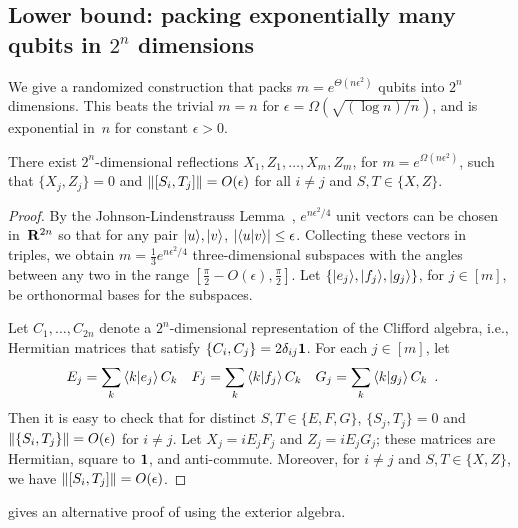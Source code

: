 \documentclass[preprintnumbers,11pt,onecolumn]{article}
\begin{document}
\subsection{Lower bound: packing exponentially many qubits in $2^n$ dimensions} \label{s:packingqubitslowerbound}

We give a randomized construction that packs $m = e^{\Theta(n \epsilon^2)}$ qubits into $2^n$ dimensions.  This beats the trivial $m = n$ for $\epsilon = \Omega(\sqrt{(\log n) / n})$, and is exponential in~$n$ for constant $\epsilon > 0$.  

\begin{theorem} \label{t:qubitpacking}
There exist $2^n$-dimensional reflections $X_1, Z_1, \ldots, X_m, Z_m$, for $m = e^{\Omega(n \epsilon^2)}$, such that $\{ X_j, Z_j \} = 0$ and ${\| [S_i, T_j] \|} = O(\epsilon)$ for all $i \neq j$ and $S,T\in\{X,Z\}$.
\end{theorem}

\begin{proof}
By the Johnson-Lindenstrauss Lemma~\cite{JohnsonLindenstrauss84, DasguptaGupta03JohnsonLindenstrauss}, $e^{n \epsilon^2 / 4}$ unit vectors can be chosen in~${\bf R}^{2 n}$ so that for any pair ${|u\rangle}, {|v\rangle}$, ${\lvert {\langle u|v\rangle}\rvert} \leq \epsilon$.  Collecting these vectors in triples, we obtain $m = \tfrac13 e^{n \epsilon^2 / 4}$ three-dimensional subspaces with the angles between any two in the range $[\tfrac\pi2 - O(\epsilon), \tfrac\pi2]$. Let $\{ {|e_j\rangle}, {|f_j\rangle}, {|g_j\rangle} \}$, for $j \in [m]$, be orthonormal bases for the subspaces.  

Let $C_1, \ldots, C_{2 n}$ denote a $2^n$-dimensional representation of the Clifford algebra, i.e., Hermitian matrices that satisfy $\{C_i, C_j\} = 2 \delta_{ij} \boldsymbol{1}$.  For each $j \in [m]$, let 
\begin{align*}
E_j &= \sum_k {\langle k|e_j\rangle} \, C_k &
F_j &= \sum_k {\langle k|f_j\rangle} \, C_k &
G_j &= \sum_k {\langle k|g_j\rangle} \, C_k
 \enspace .
\end{align*}
Then it is easy to check that for distinct $S, T \in \{E, F, G\}$, $\{S_j, T_j\} = 0$ and ${\| \{S_i, T_j\} \|} = O(\epsilon)$ for $i \neq j$.  Let $X_j = i E_j F_j$ and $Z_j = i E_j G_j$; these matrices are Hermitian, square to $\boldsymbol{1}$, and anti-commute.  Moreover, for $i \neq j$ and $S,T \in \{X, Z\}$, we have ${\| [S_i, T_j] \|} = O(\epsilon)$.  
\end{proof}

 gives an alternative proof of  using the exterior algebra.  
\end{document}
